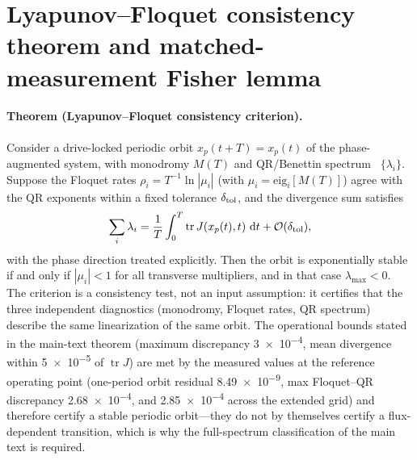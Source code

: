 \documentclass[preprint,numbers,a4paper]{elsarticle}
\newcommand{\dd}{\,\mathrm{d}}
\begin{document}
\section{Lyapunov--Floquet consistency theorem and matched-measurement Fisher lemma}
\label{SI-sec:theorems}

\paragraph{Theorem (Lyapunov--Floquet consistency criterion).}
Consider a drive-locked periodic orbit $x_p(t+T)=x_p(t)$ of the phase-augmented system, with monodromy $M(T)$ and QR/Benettin spectrum~\cite{benettin1980,wolf1985,eckmann1985} $\{\lambda_i\}$. Suppose the Floquet rates $\rho_i=T^{-1}\ln|\mu_i|$ (with $\mu_i=\mathrm{eig}_i[M(T)]$) agree with the QR exponents within a fixed tolerance $\delta_{\rm tol}$, and the divergence sum satisfies
\begin{equation}
 \sum_i\lambda_i=\frac1T\int_0^T\operatorname{tr}J(x_p(t),t)\,\dd t
 +\mathcal{O}(\delta_{\rm tol}),
\label{SI-eq:divergence-theorem}
\end{equation}
with the phase direction treated explicitly. Then the orbit is exponentially stable if and only if $|\mu_i|<1$ for all transverse multipliers, and in that case $\lambda_{\max}<0$. The criterion is a consistency test, not an input assumption: it certifies that the three independent diagnostics (monodromy, Floquet rates, QR spectrum) describe the same linearization of the same orbit. The operational bounds stated in the main-text theorem (maximum discrepancy \num{3e-4}, mean divergence within \num{5e-5} of $\operatorname{tr}J$) are met by the measured values at the reference operating point (one-period orbit residual \num{8.49e-9}, max Floquet--QR discrepancy \num{2.68e-4}, and \num{2.85e-4} across the extended grid) and therefore certify a stable periodic orbit---they do not by themselves certify a flux-dependent transition, which is why the full-spectrum classification of the main text is required.
\end{document}
